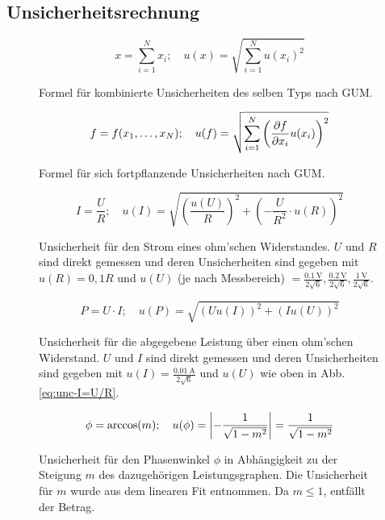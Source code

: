 

\subsection{Unsicherheitsrechnung}\label{VGuD}

\begin{figure}[h]
	\begin{equation*}
		x = \sum_{i=1}^{N} x_i
		;\quad
		u(x) = \sqrt{\sum_{i = 1}^{N} u(x_i)^2}
	\end{equation*}
	\caption{Formel für kombinierte Unsicherheiten des selben Typs nach GUM.}
	\label{eq:GUM_combine}
\end{figure}

\begin{figure}[h]
	\begin{equation*}
		f = f(x_1, \dots , x_N)
		;\quad
		u(f) = \sqrt{\sum_{i = 1}^{N}\left(\pdv{f}{x_i} u(x_i)\right) ^2}
	\end{equation*}
	\caption{Formel für sich fortpflanzende Unsicherheiten nach GUM.}
	\label{eq:GUM_formula}
\end{figure}

\begin{figure}[h]
	\begin{equation*}
		I = \frac{U}{R}
		;\quad
		u(I) = \sqrt{\left( \frac{u(U)}{R}\right) ^2 + \left( -\frac{U}{R^2}\cdot u(R)\right) ^2}
	\end{equation*}
	\caption{Unsicherheit für den Strom eines ohm'schen Widerstandes. $U$ und $R$ sind direkt gemessen und deren Unsicherheiten sind gegeben mit $u(R) = 0,1 R$ und $u(U)$ (je nach Messbereich) $= \frac{\SI{0,1}{\volt}}{2\sqrt{6}} , \frac{\SI{0,2}{\volt}}{2\sqrt{6}} , \frac{\SI{1}{\volt}}{2\sqrt{6}}$.}
	\label{eq:unc-I}
\end{figure}

\begin{figure}[h]
	\begin{equation*}
		P = U \cdot I
		;\quad
		u(P) = \sqrt{\left( U u(I)\right) ^2 + \left( I u(U)\right) ^2}
	\end{equation*}
	\caption{Unsicherheit für die abgegebene Leistung über einen ohm'schen Widerstand. $U$ und $I$ sind direkt gemessen und deren Unsicherheiten sind gegeben mit $u(I) = \frac{\SI{0,01}{\ampere}}{2\sqrt{6}}$ und $u(U)$ wie oben in Abb. \ref{eq:unc-I=U/R}.}
	\label{eq:unc-P}
\end{figure}

\begin{figure}[h]
	\begin{equation*}
		\phi = \arccos(m)
		;\quad
		u(\phi) = \abs{-\frac{1}{\sqrt{1-m^2}}} = \frac{1}{\sqrt{1-m^2}}
	\end{equation*}
	\caption{Unsicherheit für den Phasenwinkel $\phi$ in Abhängigkeit zu der Steigung $m$ des dazugehörigen Leistungsgraphen. Die Unsicherheit für $m$ wurde aus dem linearen Fit entnommen. Da $m\leq 1$, entfällt der Betrag.}
	\label{eq:unc-phi}
\end{figure}

